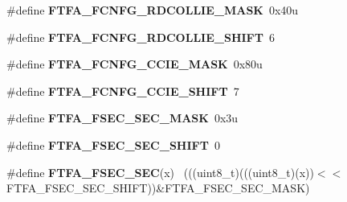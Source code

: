 \begin{DoxyCompactItemize}
\item 
\hypertarget{group___f_t_f_a___register___masks_gae9ad4a9aac7c5ef332e4c7d7af0a63a9}{}\#define {\bfseries F\+T\+F\+A\+\_\+\+F\+C\+N\+F\+G\+\_\+\+R\+D\+C\+O\+L\+L\+I\+E\+\_\+\+M\+A\+S\+K}~0x40u\label{group___f_t_f_a___register___masks_gae9ad4a9aac7c5ef332e4c7d7af0a63a9}

\item 
\hypertarget{group___f_t_f_a___register___masks_gaea7f60637733465718c684ca9c4612f6}{}\#define {\bfseries F\+T\+F\+A\+\_\+\+F\+C\+N\+F\+G\+\_\+\+R\+D\+C\+O\+L\+L\+I\+E\+\_\+\+S\+H\+I\+F\+T}~6\label{group___f_t_f_a___register___masks_gaea7f60637733465718c684ca9c4612f6}

\item 
\hypertarget{group___f_t_f_a___register___masks_gad7b9ee7d7ca0f897784ed211030e6e8f}{}\#define {\bfseries F\+T\+F\+A\+\_\+\+F\+C\+N\+F\+G\+\_\+\+C\+C\+I\+E\+\_\+\+M\+A\+S\+K}~0x80u\label{group___f_t_f_a___register___masks_gad7b9ee7d7ca0f897784ed211030e6e8f}

\item 
\hypertarget{group___f_t_f_a___register___masks_ga7032f590fbfc9a43d13109688eb3a4c0}{}\#define {\bfseries F\+T\+F\+A\+\_\+\+F\+C\+N\+F\+G\+\_\+\+C\+C\+I\+E\+\_\+\+S\+H\+I\+F\+T}~7\label{group___f_t_f_a___register___masks_ga7032f590fbfc9a43d13109688eb3a4c0}

\item 
\hypertarget{group___f_t_f_a___register___masks_ga3f0ba5e4a511479878b0505bc098ec00}{}\#define {\bfseries F\+T\+F\+A\+\_\+\+F\+S\+E\+C\+\_\+\+S\+E\+C\+\_\+\+M\+A\+S\+K}~0x3u\label{group___f_t_f_a___register___masks_ga3f0ba5e4a511479878b0505bc098ec00}

\item 
\hypertarget{group___f_t_f_a___register___masks_ga0c7032c13efe05ed6c6d86c42beb7a5f}{}\#define {\bfseries F\+T\+F\+A\+\_\+\+F\+S\+E\+C\+\_\+\+S\+E\+C\+\_\+\+S\+H\+I\+F\+T}~0\label{group___f_t_f_a___register___masks_ga0c7032c13efe05ed6c6d86c42beb7a5f}

\item 
\hypertarget{group___f_t_f_a___register___masks_ga32016cb484a6f4d1ed623bb5e7cfea47}{}\#define {\bfseries F\+T\+F\+A\+\_\+\+F\+S\+E\+C\+\_\+\+S\+E\+C}(x)                                              ~(((uint8\+\_\+t)(((uint8\+\_\+t)(x))$<$$<$F\+T\+F\+A\+\_\+\+F\+S\+E\+C\+\_\+\+S\+E\+C\+\_\+\+S\+H\+I\+F\+T))\&F\+T\+F\+A\+\_\+\+F\+S\+E\+C\+\_\+\+S\+E\+C\+\_\+\+M\+A\+S\+K)\label{group___f_t_f_a___register___masks_ga32016cb484a6f4d1ed623bb5e7cfea47}


\end{DoxyCompactItemize}
